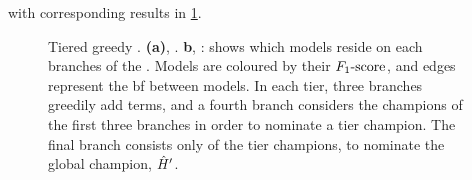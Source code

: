 with corresponding results in \cref{fig:example_es_tiered_greedy}. 
\begin{figure}[H]
    \begin{center}
    \qquad
    \end{center}
    \caption[Tiered greedy ]{
        Tiered greedy . 
        \textbf{(a)}, . 
        \textbf{b}, : shows which models reside on each branches of the . 
        Models are coloured by their $ F_{1}\text{-score} $, and edges represent the \gls{bf} between models. 
        In each tier, three branches greedily add terms, and a fourth branch considers the champions of the first three branches
        in order to nominate a tier champion. 
        The final branch consists only of the tier champions, to nominate the global champion, $\hat{H}^{\prime}$.  
    }
    \label{fig:example_es_tiered_greedy}
\end{figure}

